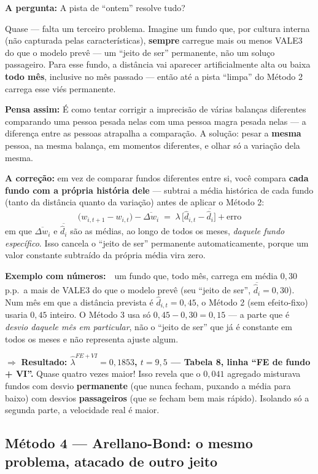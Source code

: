 \documentclass[11pt,a4paper]{article}
\newcommand{\pergunta}[1]{\par\vspace{4pt}\noindent\textbf{\color{azul}A pergunta:} #1\par\vspace{2pt}}
\newcommand{\analogia}[1]{\par\vspace{4pt}\noindent\textbf{\color{verde}Pensa assim:} #1\par\vspace{2pt}}
\newcommand{\exemplo}[0]{\par\vspace{4pt}\noindent\textbf{\color{vermelho}Exemplo com números:}\ }
\begin{document}
\pergunta{A pista de ``ontem'' resolve tudo?}

Quase --- falta um terceiro problema. Imagine um fundo que, por cultura interna (não capturada
pelas características), \textbf{sempre} carregue mais ou menos VALE3 do que o modelo prevê ---
um ``jeito de ser'' permanente, não um soluço passageiro. Para esse fundo, a distância vai
aparecer artificialmente alta ou baixa \textbf{todo mês}, inclusive no mês passado --- então até
a pista ``limpa'' do Método 2 carrega esse viés permanente.

\analogia{É como tentar corrigir a imprecisão de várias balanças diferentes comparando uma
pessoa pesada nelas com uma pessoa magra pesada nelas --- a diferença entre as pessoas atrapalha
a comparação. A solução: pesar a \textbf{mesma} pessoa, na mesma balança, em momentos diferentes,
e olhar só a variação dela mesma.}

\textbf{A correção:} em vez de comparar fundos diferentes entre si, você compara \textbf{cada
fundo com a própria história dele} --- subtrai a média histórica de cada fundo (tanto da
distância quanto da variação) antes de aplicar o Método 2:
$$\big(w_{i,t+1}-w_{i,t}\big) - \overline{\Delta w_i} \;=\; \lambda\,\Big[\widehat d_{i,t} -
\overline{\widehat d_i}\Big] + \text{erro}$$
em que $\overline{\Delta w_i}$ e $\overline{\widehat d_i}$ são as médias, ao longo de todos os
meses, \emph{daquele fundo específico}. Isso cancela o ``jeito de ser'' permanente
automaticamente, porque um valor constante subtraído da própria média vira zero.

\exemplo\ um fundo que, todo mês, carrega em média $0{,}30$ p.p.\ a mais de VALE3 do que o modelo
prevê (seu ``jeito de ser'', $\overline{\widehat d_i}=0{,}30$). Num mês em que a distância prevista
é $\widehat d_{i,t}=0{,}45$, o Método 2 (sem efeito-fixo) usaria $0{,}45$ inteiro. O Método 3 usa
só $0{,}45-0{,}30=0{,}15$ --- a parte que é \emph{desvio daquele mês em particular}, não o
``jeito de ser'' que já é constante em todos os meses e não representa ajuste algum.

$\Rightarrow$ \textbf{Resultado: $\widehat\lambda^{FE+VI}=0{,}1853$, $t=9{,}5$ --- Tabela 8, linha ``FE de
fundo + VI''.} Quase quatro vezes maior! Isso revela que o $0{,}041$ agregado misturava fundos
com desvio \textbf{permanente} (que nunca fecham, puxando a média para baixo) com desvios
\textbf{passageiros} (que se fecham bem mais rápido). Isolando só a segunda parte, a velocidade
real é maior.

\subsection{Método 4 --- Arellano-Bond: o mesmo problema, atacado de outro jeito}
\end{document}
